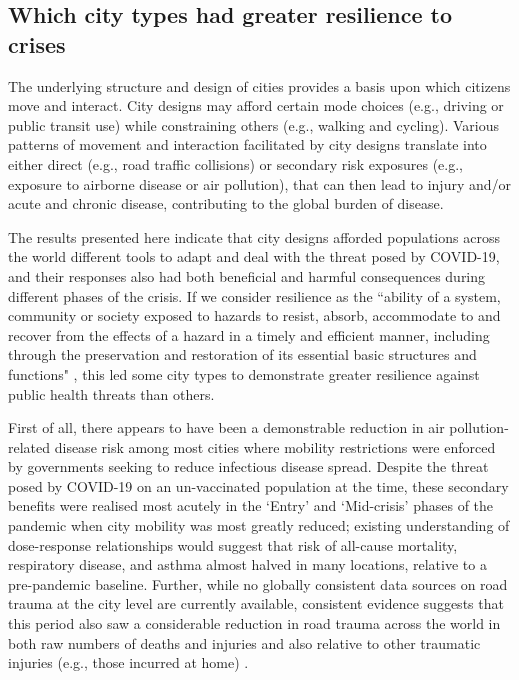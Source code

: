 \documentclass[preprint,10pt]{elsarticle} %
\begin{document}
\subsection*{Which city types had greater resilience to crises}
The underlying structure and design of cities provides a basis upon which citizens move and interact. City designs may afford certain mode choices (e.g., driving or public transit use) while constraining others (e.g., walking and cycling). Various patterns of movement and interaction facilitated by city designs translate into either direct (e.g., road traffic collisions) or secondary risk exposures (e.g., exposure to airborne disease or air pollution), that can then lead to injury and/or acute and chronic disease, contributing to the global burden of disease.

The results presented here indicate that city designs afforded populations across the world different tools to adapt and deal with the threat posed by COVID-19, and their responses also had both beneficial and harmful consequences during different phases of the crisis. If we consider resilience as the ``ability of a system, community or society exposed to hazards to resist, absorb, accommodate to and recover from the effects of a hazard in a timely and efficient manner, including through the preservation and restoration of its essential basic structures and functions" \cite{unisdr2009terminology}, this led some city types to demonstrate greater resilience against public health threats than others.

First of all, there appears to have been a demonstrable reduction in air pollution-related disease risk among most cities where mobility restrictions were enforced by governments seeking to reduce infectious disease spread. Despite the threat posed by COVID-19 on an un-vaccinated population at the time, these secondary benefits were realised most acutely in the `Entry' and `Mid-crisis' phases of the pandemic when city mobility was most greatly reduced; existing understanding of dose-response relationships would suggest that risk of all-cause mortality, respiratory disease, and asthma  almost halved in many locations, relative to a pre-pandemic baseline. Further, while no globally consistent data sources on road trauma at the city level are currently available, consistent evidence suggests that this period also saw a considerable reduction in road trauma across the world in both raw numbers of deaths and injuries \cite{saladie2023back} and also relative to other traumatic injuries (e.g., those incurred at home) \cite{WASEEM2021200}.
\end{document}
